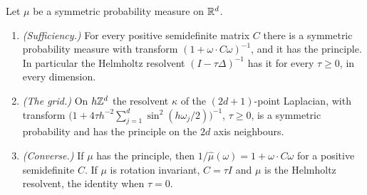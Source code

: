 \begin{proposition}
\label{prop:stage-lemma}
\leanok
{}
Let $\mu$ be a symmetric probability measure on $\mathbb{R}^d$.
\begin{enumerate}
\item \emph{(Sufficiency.)} For every positive semidefinite matrix $C$ there is a symmetric
probability measure with transform $(1 + \omega\cdot C\omega)^{-1}$, and it has the principle. In
particular the Helmholtz resolvent $(I - \tau\Delta)^{-1}$ has it for every $\tau \ge 0$, in every
dimension.
\item \emph{(The grid.)} On $h\mathbb{Z}^d$ the resolvent $\kappa$ of the $(2d+1)$-point Laplacian, with
transform $\bigl(1 + 4\tau h^{-2}\sum_{j=1}^d\sin^2(h\omega_j/2)\bigr)^{-1}$, $\tau \ge 0$, is a
symmetric probability and has the principle on the $2d$ axis neighbours.
\item \emph{(Converse.)} If $\mu$ has the principle, then $1/\widehat\mu(\omega) = 1 + \omega\cdot
C\omega$ for a positive semidefinite $C$. If $\mu$ is rotation invariant, $C = \tau I$ and $\mu$ is
the Helmholtz resolvent, the identity when $\tau = 0$.
\end{enumerate}

\end{proposition}
